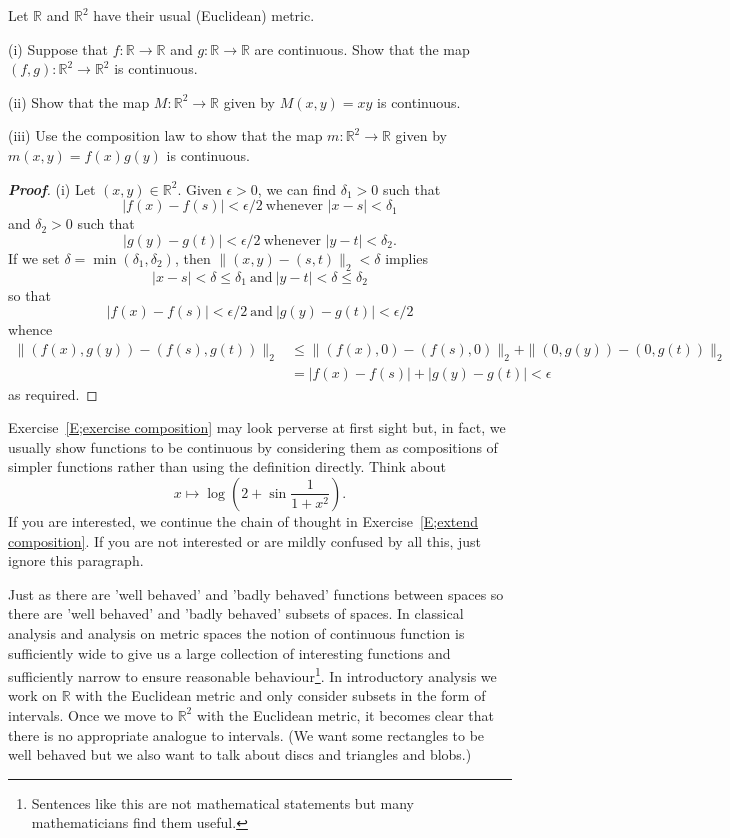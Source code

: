 \begin{theorem}\label{E;exercise composition}
Let ${\mathbb R}$ and ${\mathbb R}^{2}$ have their usual (Euclidean) metric.

(i) Suppose that $f:{\mathbb R}\rightarrow{\mathbb R}$ and
$g:{\mathbb R}\rightarrow{\mathbb R}$ are continuous. Show that
the map $(f,g):{\mathbb R}^{2}\rightarrow{\mathbb R}^{2}$
is continuous.

(ii) Show that the map $M:{\mathbb R}^{2}\rightarrow{\mathbb R}$
given by $M(x,y)=xy$ is continuous.

(iii) Use the composition law to show that the map 
$m:{\mathbb R}^{2}\rightarrow{\mathbb R}$ 
given by $m(x,y)=f(x)g(y)$ is continuous.
\end{theorem} 
\begin{proof}[\bf Proof] (i) Let $(x,y)\in{\mathbb R}^{2}$.
Given $\epsilon>0$, we can find $\delta_{1}>0$ such that
\[|f(x)-f(s)|<\epsilon/2\ \text{whenever $|x-s|<\delta_{1}$}\]
and  
$\delta_{2}>0$ such that
\[|g(y)-g(t)|<\epsilon/2\ \text{whenever $|y-t|<\delta_{2}$}.\]
If we set $\delta=\min(\delta_{1},\delta_{2})$, then
$\|(x,y)-(s,t)\|_{2}<\delta$ implies
\[
|x-s|<\delta\leq\delta_{1}
\ \text{and}\ |y-t|<\delta\leq\delta_{2}
\]
so that
\[|f(x)-f(s)|<\epsilon/2\ \text{and}\ |g(y)-g(t)|<\epsilon/2\]
whence
\begin{align*}
\|(f(x),g(y))-(f(s),g(t))\|_{2}
&\leq \|(f(x),0)-(f(s),0)\|_{2}+\|(0,g(y))-(0,g(t))\|_{2}\\
&=|f(x)-f(s)|+|g(y)-g(t)|<\epsilon
\end{align*}
as required.
\end{proof}


Exercise~\ref{E;exercise composition} may look perverse
at first sight but, in fact, we usually show functions
to be continuous by considering them as compositions
of simpler functions rather than using the definition directly.
Think about 
\[x\mapsto \log\left(2+\sin\frac{1}{1+x^{2}}\right).\]
If you are interested, we continue the chain of thought
in Exercise~\ref{E;extend composition}. If you are not interested
or are mildly confused by all this,
just ignore this paragraph.

Just as there are 'well behaved' and 'badly behaved' functions
between spaces
so there are 'well behaved' and 'badly behaved' subsets
of spaces. In classical analysis and analysis on metric spaces
the notion of continuous function is sufficiently wide
to give us a large collection of interesting functions
and sufficiently narrow to ensure reasonable 
behaviour\footnote{Sentences like this are not mathematical
statements but many mathematicians find them useful.}.
In introductory analysis we work on ${\mathbb R}$ with
the Euclidean metric and only consider subsets in the
form of intervals. Once we move to ${\mathbb R}^{2}$ with
the Euclidean metric, it becomes clear that there is
no appropriate analogue to intervals. (We want some rectangles
to be well behaved but we also want to talk about discs and
triangles and blobs.)

